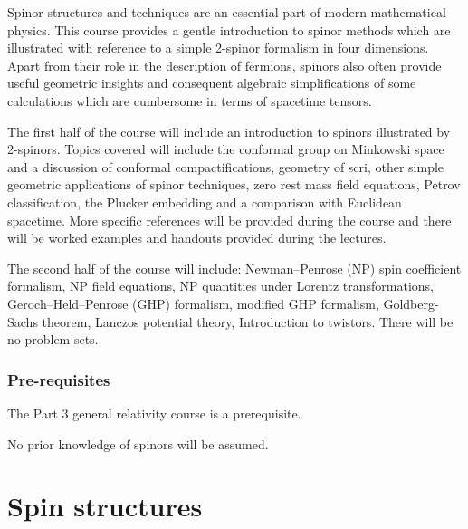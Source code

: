 \documentclass[a4paper]{article}
\begin{document}
\maketitle
{\small
\setlength{\parindent}{0em}
\setlength{\parskip}{1em}
Spinor structures and techniques are an essential part of modern mathematical physics. This course provides a gentle introduction to spinor methods which are illustrated with reference to a simple 2-spinor formalism in four dimensions. Apart from their role in the description of fermions, spinors also often provide useful geometric insights and consequent algebraic simplifications of some calculations which are cumbersome in terms of spacetime tensors.

The first half of the course will include an introduction to spinors illustrated by 2-spinors. Topics covered will include the conformal group on Minkowski space and a discussion of conformal compactifications, geometry of scri, other simple geometric applications of spinor techniques, zero rest mass field equations, Petrov classification, the Plucker embedding and a comparison with Euclidean spacetime. More specific references will be provided during the course and there will be worked examples and handouts provided during the lectures.

The second half of the course will include: Newman--Penrose (NP) spin coefficient formalism, NP field equations, NP quantities under Lorentz transformations, Geroch--Held--Penrose (GHP) formalism, modified GHP formalism, Goldberg-Sachs theorem, Lanczos potential theory, Introduction to twistors. There will be no problem sets.
\subsubsection*{Pre-requisites}
The Part 3 general relativity course is a prerequisite.

No prior knowledge of spinors will be assumed.
}
\tableofcontents

\section{Spin structures}
\end{document}

